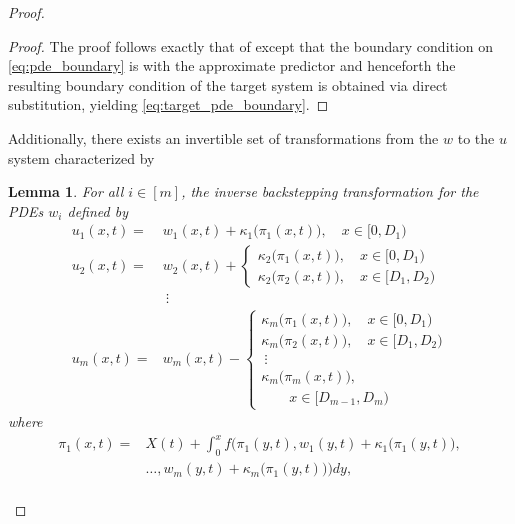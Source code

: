 \documentclass[letterpaper, 10 pt, conference]{ieeeconf}  %
\newtheorem{lemma}[theorem]{Lemma}
\begin{document}
\begin{proof}
\begin{proof}
    The proof follows exactly that of \cite[Lemma 1]{Bekiaris-Liberis_Krstic:2016} except that the boundary condition on \eqref{eq:pde_boundary} is with the approximate predictor and henceforth the resulting boundary condition of the target system is obtained via direct substitution, yielding \eqref{eq:target_pde_boundary}. 
\end{proof}


Additionally, there exists an invertible set of transformations from the $w$ to the $u$ system characterized by

\begin{lemma}\label{lemma:inverse-backstepping-transforms}
    For all $i \in [m]$, the inverse backstepping transformation for the PDEs $w_i$ defined by 
    \begin{subequations}
    \begin{align}
        u_1(x,t) =& w_1(x,t) + \kappa_1\bigg(\pi_1(x,t)\bigg), \quad x \in [0, D_1) \label{eq:inv_w1} \\
        u_2(x,t) =& w_2(x,t) +
            \begin{cases}
                \kappa_2\bigg(\pi_1(x,t)\bigg), \quad x \in [0, D_1) \\
                \kappa_2\bigg(\pi_2(x,t)\bigg), \quad x \in [D_1, D_2)
            \end{cases} \label{eq:inv_w2} \\
        &\ \vdots \nonumber \\
        u_m(x,t) =& w_m(x,t) -
            \begin{cases}
                \kappa_m\bigg(\pi_1(x,t)\bigg), \quad x \in [0, D_1) \\
                \kappa_m\bigg(\pi_2(x,t)\bigg), \quad x \in [D_1, D_2) \\
                \ \vdots \\
                \kappa_m\bigg(\pi_m(x,t)\bigg),\\ \qquad x \in [D_{m-1}, D_m)
            \end{cases} \label{eq:inv_wm}
    \end{align}
    \end{subequations}
    where
    \begin{subequations}
    \begin{align}
        \pi_1(x,t) =& X(t) + \int_0^x f \bigg (\pi_1(y,t), w_1(y,t) + \kappa_1 \bigg( \pi_1(y,t) \bigg), \nonumber \\ & \ldots, w_m(y,t) + \kappa_m \bigg( \pi_1(y,t) \bigg) \bigg) dy, \label{eq:pi1} \\

\end{align}
\end{subequations}
\end{lemma}
\end{proof}
\end{document}
